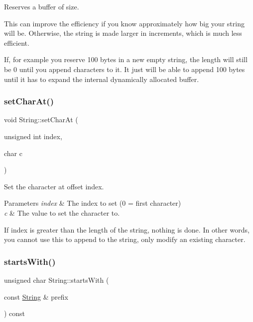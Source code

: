 Reserves a buffer of size. 

This can improve the efficiency if you know approximately how big your string will be. Otherwise, the string is made larger in increments, which is much less efficient.

If, for example you reserve 100 bytes in a new empty string, the length will still be 0 until you append characters to it. It just will be able to append 100 bytes until it has to expand the internal dynamically allocated buffer. \mbox{\label{class_string_a000b7c7b89bbd326a9b966a79bc838e8}} 
\subsubsection{\texorpdfstring{set\+Char\+At()}{setCharAt()}}
{\footnotesize\ttfamily void String\+::set\+Char\+At (\begin{DoxyParamCaption}\item[{unsigned int}]{index,  }\item[{char}]{c }\end{DoxyParamCaption})}



Set the character at offset index. 


\begin{DoxyParams}{Parameters}
{\em index} & The index to set (0 = first character)\\
\hline
{\em c} & The value to set the character to.\\
\hline
\end{DoxyParams}
If index is greater than the length of the string, nothing is done. In other words, you cannot use this to append to the string, only modify an existing character. \mbox{\label{class_string_aa63267cdf821b619ffb0a103510ae6ff}} 
\subsubsection{\texorpdfstring{starts\+With()}{startsWith()}\hspace{0.1cm}{\footnotesize\ttfamily [1/2]}}
{\footnotesize\ttfamily unsigned char String\+::starts\+With (\begin{DoxyParamCaption}\item[{const \hyperlink{class_string}{String} \&}]{prefix }\end{DoxyParamCaption}) const}



